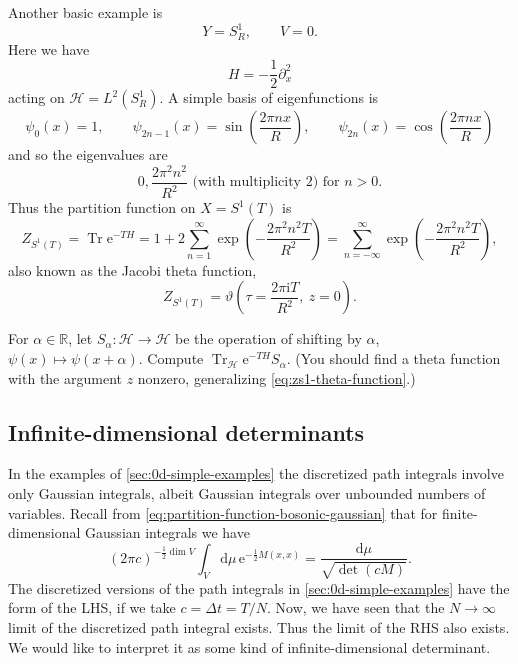 \documentclass[12pt,letterpaper,reqno]{article}
\numberwithin{equation}{section}
\newcommand{\cH}{\ensuremath{\mathcal H}}
\newcommand{\R}{\ensuremath{\mathbb R}}
\newcommand{\half}{\ensuremath{\frac{1}{2}}}
\newcommand{\I}{{\mathrm i}}
\newcommand{\e}{{\mathrm e}}
\newcommand{\de}{\mathrm{d}}
\DeclareMathOperator{\Tr}{Tr}
\begin{document}
\begin{example} \label{exa:sigma-model-s1}
Another basic example is
\begin{equation}
  Y = S^1_R, \qquad V = 0.
\end{equation}
Here we have
\begin{equation}
  H = -\half \partial_x^2
\end{equation}
acting on $\cH = L^2(S^1_R)$. A simple basis of eigenfunctions is
\begin{equation}
  \psi_0(x) = 1, \qquad \psi_{2n-1}(x) = \sin\left(\frac{2 \pi n x}{R}\right), \qquad \psi_{2n}(x) = \cos\left(\frac{2 \pi n x}{R}\right)
\end{equation}
and so the eigenvalues are
\begin{equation}
  0, \frac{2 \pi^2 n^2}{R^2} \text{ (with multiplicity $2$) for $n > 0$}.
\end{equation}
Thus the partition function on $X = S^1(T)$ is
\begin{equation}
  Z_{S^1(T)} = \Tr \e^{-T H} = 1 + 2 \sum_{n=1}^\infty \exp\left(-\frac{2 \pi^2 n^2 T}{R^2}\right) = \sum_{n = -\infty}^\infty \exp\left(-\frac{2 \pi^2 n^2 T}{R^2}\right),
\end{equation}
also known as the Jacobi theta function,
\begin{equation} \label{eq:zs1-theta-function}
  Z_{S^1(T)} = \vartheta \left(\tau = \frac{2 \pi \I T}{R^2}, \ z = 0\right).
\end{equation}
\end{example}

\begin{exercise} For $\alpha \in \R$, let $S_\alpha: \cH \to \cH$ be the operation 
of shifting by $\alpha$, $\psi(x) \mapsto \psi(x + \alpha)$. Compute $\Tr_{\cH} \e^{-TH} S_\alpha$.
(You should find a theta function with the argument $z$ nonzero, generalizing \eqref{eq:zs1-theta-function}.)
\end{exercise}

\subsection{Infinite-dimensional determinants} \label{sec:infinite-dets}

In the examples of \autoref{sec:0d-simple-examples} the discretized 
path integrals involve 
only Gaussian integrals, albeit Gaussian integrals over unbounded numbers of variables.
Recall from \eqref{eq:partition-function-bosonic-gaussian}
that for finite-dimensional Gaussian integrals we have
\begin{equation} \label{eq:partition-function-bosonic-gaussian-redux}
  (2\pi c)^{-\half \dim V} \int_{V} \de \mu \, \e^{-\half M(x,x)} = \frac{\de\mu}{\sqrt{\det (c M)}}.
\end{equation}
The discretized versions of the path integrals in \autoref{sec:0d-simple-examples}
have the form of the LHS, if we take $c = \Delta t = T/N$.
Now, we have seen that the $N \to \infty$ limit of the discretized path integral exists.
Thus the limit of the RHS also exists.
We would like to interpret it as some kind of infinite-dimensional
determinant.
\end{document}

